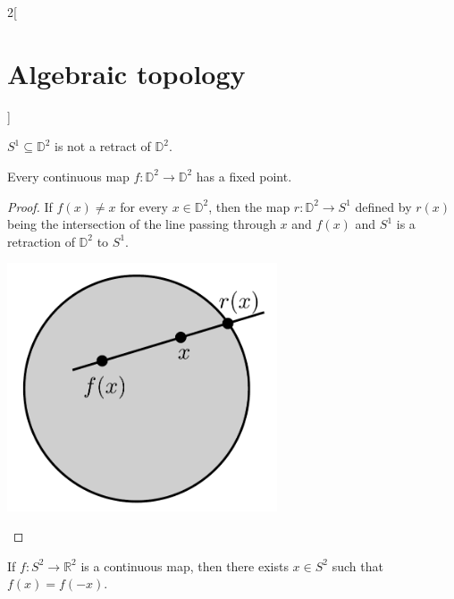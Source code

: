 \documentclass[../../../main_math.tex]{subfiles}
\begin{document}
\begin{multicols}{2}[\section{Algebraic topology}]
	\begin{corollary}
		$S^1\subseteq \mathbb{D}^2$ is not a retract of $\mathbb{D}^2$.
	\end{corollary}


	\begin{theorem}[Brower 1910]
		\label{Brower}
		Every continuous map $f:\mathbb{D}^2 \to \mathbb{D}^2$ has a fixed point. 
	\end{theorem}

	\begin{proof}
		
		\begin{minipage}{0.3\textwidth}
			If $f(x)\neq x$ for every $x\in \mathbb{D}^2$, then the map $r: \mathbb{D}^2 \to S^1$ defined by $r(x)$ being the intersection of the line passing through $x$ and $f(x)$ and $S^1$ is a retraction of $\mathbb{D}^2$ to $S^1$.
		\end{minipage}
		\begin{minipage}{0.2\textwidth}
			\begin{center}
				\includegraphics[width=0.6\textwidth]{Images/Brower.pdf}
			\end{center}
		\end{minipage}

	\end{proof}
	
	

	\begin{theorem}
		If $f:S^2 \to \mathbb{R}^2$ is a continuous map, then there exists $x\in S^2$ such that $f(x)=f(-x)$.
	\end{theorem}
	
	
\end{multicols}
\end{document}
